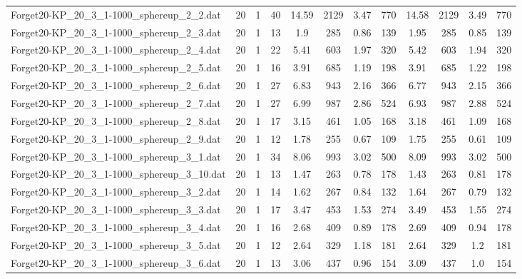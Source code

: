 \begin{sidewaystable}[!ht]
{\begin{tabular}{lccccccccccc}
Forget20-KP\_20\_3\_1-1000\_sphereup\_2\_2.dat & 20 & 1 & 40 & 14.59 & 2129 &  \textcolor{blue2}{3.47} & 770 & 14.58 & 2129 & 3.49 & 770 \\
Forget20-KP\_20\_3\_1-1000\_sphereup\_2\_3.dat & 20 & 1 & 13 & 1.9 & 285 & 0.86 & 139 & 1.95 & 285 &  \textcolor{blue2}{0.85} & 139 \\
Forget20-KP\_20\_3\_1-1000\_sphereup\_2\_4.dat & 20 & 1 & 22 & 5.41 & 603 & 1.97 & 320 & 5.42 & 603 &  \textcolor{blue2}{1.94} & 320 \\
Forget20-KP\_20\_3\_1-1000\_sphereup\_2\_5.dat & 20 & 1 & 16 & 3.91 & 685 & 1.19 & 198 & 3.91 & 685 & 1.22 & 198 \\
Forget20-KP\_20\_3\_1-1000\_sphereup\_2\_6.dat & 20 & 1 & 27 & 6.83 & 943 & 2.16 & 366 & 6.77 & 943 &  \textcolor{blue2}{2.15} & 366 \\
Forget20-KP\_20\_3\_1-1000\_sphereup\_2\_7.dat & 20 & 1 & 27 & 6.99 & 987 &  \textcolor{blue2}{2.86} & 524 & 6.93 & 987 & 2.88 & 524 \\
Forget20-KP\_20\_3\_1-1000\_sphereup\_2\_8.dat & 20 & 1 & 17 & 3.15 & 461 & 1.05 & 168 & 3.18 & 461 & 1.09 & 168 \\
Forget20-KP\_20\_3\_1-1000\_sphereup\_2\_9.dat & 20 & 1 & 12 & 1.78 & 255 & 0.67 & 109 & 1.75 & 255 &  \textcolor{blue2}{0.61} & 109 \\
Forget20-KP\_20\_3\_1-1000\_sphereup\_3\_1.dat & 20 & 1 & 34 & 8.06 & 993 &  \textcolor{blue2}{3.02} & 500 & 8.09 & 993 &  \textcolor{blue2}{3.02} & 500 \\
Forget20-KP\_20\_3\_1-1000\_sphereup\_3\_10.dat & 20 & 1 & 13 & 1.47 & 263 &  \textcolor{blue2}{0.78} & 178 & 1.43 & 263 & 0.81 & 178 \\
Forget20-KP\_20\_3\_1-1000\_sphereup\_3\_2.dat & 20 & 1 & 14 & 1.62 & 267 & 0.84 & 132 & 1.64 & 267 &  \textcolor{blue2}{0.79} & 132 \\
Forget20-KP\_20\_3\_1-1000\_sphereup\_3\_3.dat & 20 & 1 & 17 & 3.47 & 453 &  \textcolor{blue2}{1.53} & 274 & 3.49 & 453 & 1.55 & 274 \\
Forget20-KP\_20\_3\_1-1000\_sphereup\_3\_4.dat & 20 & 1 & 16 & 2.68 & 409 &  \textcolor{blue2}{0.89} & 178 & 2.69 & 409 & 0.94 & 178 \\
Forget20-KP\_20\_3\_1-1000\_sphereup\_3\_5.dat & 20 & 1 & 12 & 2.64 & 329 &  \textcolor{blue2}{1.18} & 181 & 2.64 & 329 & 1.2 & 181 \\
Forget20-KP\_20\_3\_1-1000\_sphereup\_3\_6.dat & 20 & 1 & 13 & 3.06 & 437 & 0.96 & 154 & 3.09 & 437 & 1.0 & 154 \\

\end{tabular}}
\end{sidewaystable}
